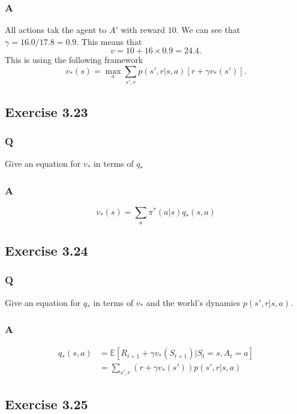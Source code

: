 \subsubsection{A}
All actions tak the agent to $A'$ with reward $10$. We can see that $\gamma = 16.0 / 17.8 = 0.9$. This means that
\begin{equation}
    v = 10 + 16 \times 0.9 = 24.4.
\end{equation}
This is using the following framework
\begin{equation}
    v_*(s) = \max_{a}\sum_{s', r} p (s', r| s, a)[r + \gamma v_*(s')].
\end{equation}


\subsection{Exercise 3.23}
\subsubsection{Q}
Give an equation for $v_*$ in terms of $q_*$

\subsubsection{A}
\begin{equation}
    v_*(s) = \sum_a \pi^*(a | s) q_*(s, a)
\end{equation}


\subsection{Exercise 3.24}
\subsubsection{Q}
Give an equation for $q_*$ in terms of $v_*$ and the world's dynamics $p(s', r| s, a)$.

\subsubsection{A}
\begin{align}
    q_* (s, a) &= \mathbb{E} [ R_{t+1} + \gamma v_*(S_{t+1}) | S_t = s, A_t = a] \\
    &= \sum_{s', r} (r + \gamma v_*(s'))p(s', r | s, a)
\end{align} 


\subsection{Exercise 3.25}
